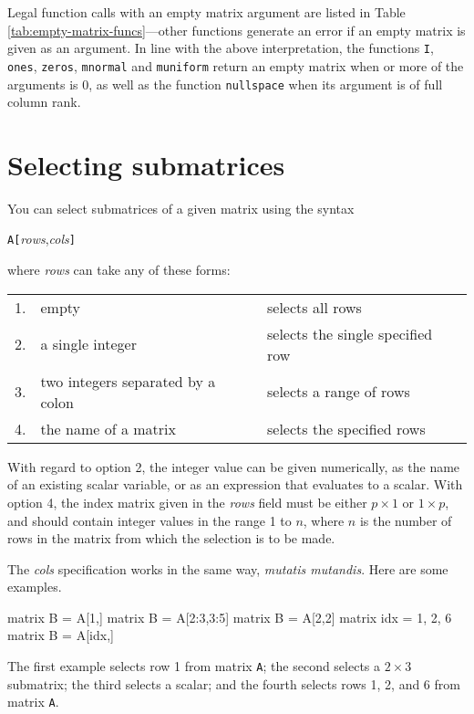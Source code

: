 Legal function calls with an empty matrix argument are listed in Table
\ref{tab:empty-matrix-funcs}---other functions generate an error if an
empty matrix is given as an argument.  In line with the above
interpretation, the functions \texttt{I}, \texttt{ones},
\texttt{zeros}, \texttt{mnormal} and \texttt{muniform} return an empty
matrix when or more of the arguments is 0, as well as the function
\texttt{nullspace} when its argument is of full column rank.

\section{Selecting submatrices}
\label{sec:matrix-sub}

You can select submatrices of a given matrix using the syntax

\hspace{1em} \texttt{A[}\textsl{rows},\textsl{cols}\texttt{]}

where \textsl{rows} can take any of these forms:

\begin{center}
\begin{tabular}{lll}
1. & empty & selects all rows \\
2. & a single integer & selects the single specified row \\
3. & two integers separated by a colon & selects a range of rows \\
4. & the name of a matrix & selects the specified rows \\
\end{tabular}
\end{center}

With regard to option 2, the integer value can be given numerically,
as the name of an existing scalar variable, or as an expression that
evaluates to a scalar.  With option 4, the index matrix given in the
\textsl{rows} field must be either $p\times 1$ or $1\times p$, and
should contain integer values in the range 1 to $n$, where $n$ is the
number of rows in the matrix from which the selection is to be made.

The \textsl{cols} specification works in the same way, \textit{mutatis
  mutandis}.  Here are some examples.
%
\begin{code}
matrix B = A[1,]
matrix B = A[2:3,3:5]
matrix B = A[2,2]
matrix idx = {1, 2, 6}
matrix B = A[idx,]
\end{code}
%
The first example selects row 1 from matrix \texttt{A}; the second
selects a $2\times 3$ submatrix; the third selects a scalar; and
the fourth selects rows 1, 2, and 6 from matrix \texttt{A}.

